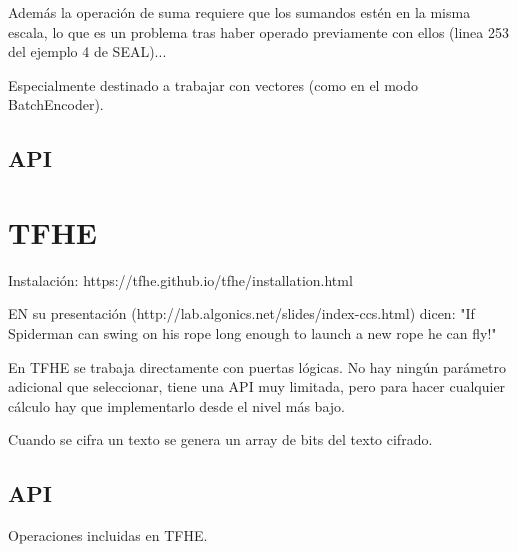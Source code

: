 Además la operación de suma requiere que los sumandos estén en la misma escala, lo que es un problema tras haber operado previamente con ellos (linea 253 del ejemplo 4 de SEAL)...

Especialmente destinado a trabajar con vectores (como en el modo BatchEncoder).

\subsection{API}



\section{TFHE}

Instalación: https://tfhe.github.io/tfhe/installation.html

EN su presentación (http://lab.algonics.net/slides/index-ccs.html) dicen: "If Spiderman can swing on his rope long enough to launch a new rope he can fly!"

En TFHE se trabaja directamente con puertas lógicas. No hay ningún parámetro adicional que seleccionar, tiene una API muy limitada, pero para hacer cualquier cálculo hay que implementarlo desde el nivel más bajo.

Cuando se cifra un texto se genera un array de bits del texto cifrado.

\subsection{API}

Operaciones incluidas en TFHE.

